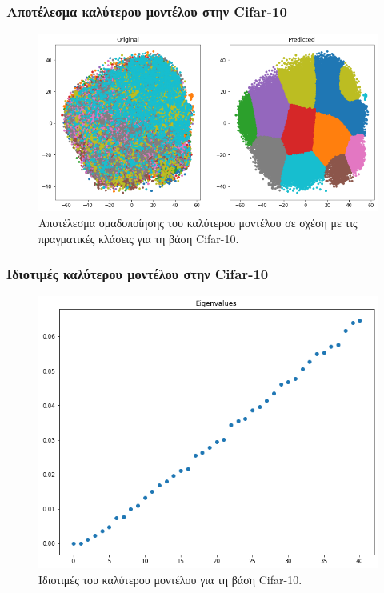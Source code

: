 \documentclass{beamer}
\begin{document}
\begin{frame}
\frametitle{Αποτέλεσμα καλύτερου μοντέλου στην Cifar-10}

\begin{figure}[H]
    \centering
    \includegraphics[width=0.8\linewidth]{cifar/best_model_results.png}
    \caption{Αποτέλεσμα ομαδοποίησης του καλύτερου μοντέλου σε σχέση με τις
    πραγματικές κλάσεις για τη βάση Cifar-10.}
    \label{fig:cifar_best_model_results}
\end{figure}

\end{frame}

\begin{frame}
\frametitle{Ιδιοτιμές καλύτερου μοντέλου στην Cifar-10}

\begin{figure}[H]
    \centering
    \includegraphics[width=0.6\linewidth]{cifar/eigenvalues.png}
    \caption{Ιδιοτιμές του καλύτερου μοντέλου για τη βάση Cifar-10.}
    \label{fig:cifar_eigenvalues}
\end{figure}

\end{frame}
\end{document}
